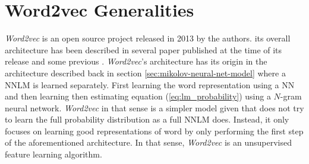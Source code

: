 





\section{Word2vec Generalities}

\textit{Word2vec} is an open source project released in 2013 by the authors.
its overall architecture has been described in several paper published at the
time of its release
\cite{DBLP:journals/corr/abs-1301-3781,MikolovSCCD13,conf/naacl/MikolovYZ13}
and some previous  \cite{mikolovphd2012}.  \textit{Word2vec}'s architecture
has its origin  in the architecture described back in section 
\ref{sec:mikolov-neural-net-model} where a \ac{NNLM} is learned separately. 
First learning the word representation using a \ac{NN} and then learning then
estimating equation (\ref{eq:lm_probability}) using a $N$-gram neural
network.  \textit{Word2vec} in that sense is a simpler model given that does not try to
learn the full probability distribution as a full \ac{NNLM} does. Instead, it
only focuses on learning good representations of word by  only performing  the first step
of the aforementioned architecture.  In that sense, \textit{Word2vec} is an
unsupervised feature learning algorithm.

